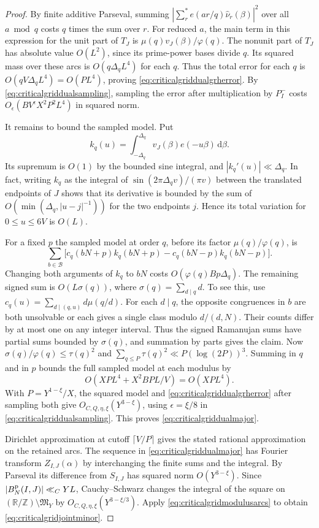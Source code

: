 \documentclass[11pt,a4paper]{article}
\numberwithin{equation}{section}
\newcommand{\ud}{\mathrm d}
\begin{document}
\begin{proof}
By finite additive Parseval, summing
$|\sum_r^*e(ar/q)\widehat\nu_r(\beta)|^2$ over all $a\bmod q$
costs $q$ times the sum over $r$. For reduced $a$, the main
term in this expression for the unit part of $T_J$ is
$\mu(q)v_J(\beta)/\varphi(q)$. The nonunit part of $T_J$
has absolute value $O(L^2)$, since its prime-power bases
divide $q$. Its squared mass over these arcs is
$O(q\Delta_q L^4)$ for each $q$. Thus the total error for
each $q$ is $O(qV\Delta_q L^4)=O(PL^4)$, proving
\cref{eq:criticalgriddualgrherror}. By
\cref{eq:criticalgriddualsampling}, sampling the error after
multiplication by $P_I^-$ costs $O_\epsilon(BV^\epsilon X^2P^2L^4)$
in squared norm.

It remains to bound the sampled model. Put
\[
 k_q(u)=\int_{-\Delta_q}^{\Delta_q}v_J(\beta)e(-u\beta)\,\ud\beta .
\]
Its supremum is $O(1)$ by the bounded sine integral, and
$|k_q'(u)|\ll \Delta_q$. In fact, writing $k_q$ as the
integral of $\sin(2\pi\Delta_q v)/(\pi v)$ between the
translated endpoints of $J$ shows that its derivative is
bounded by the sum of
$O(\min(\Delta_q,|u-j|^{-1}))$ for the two endpoints $j$.
Hence its total variation for $0\le u\le 6V$ is $O(L)$.

For a fixed $p$ the sampled model at order $q$, before its
factor $\mu(q)/\varphi(q)$, is
\[
 \sum_{b\in\mathcal B}\bigl[
     c_q(bN+p)k_q(bN+p)-c_q(bN-p)k_q(bN-p)\bigr].
\]
Changing both arguments of $k_q$ to $bN$ costs
$O(\varphi(q)Bp\Delta_q)$. The remaining signed sum is
$O(L\sigma(q))$, where $\sigma(q)=\sum_{d\mid q}d$.
To see this, use $c_q(u)=\sum_{d\mid(q,u)}d\mu(q/d)$.
For each $d\mid q$, the opposite congruences in $b$ are
both unsolvable or each gives a single class modulo $d/(d,N)$.
Their counts differ by at most one on any integer interval.
Thus the signed Ramanujan sums have partial sums bounded
by $\sigma(q)$, and summation by parts gives the claim.
Now $\sigma(q)/\varphi(q)\le\tau(q)^2$ and
$\sum_{q\le P}\tau(q)^2\ll P(\log(2P))^3$. Summing in $q$
and in $p$ bounds the full sampled model at each modulus by
\[
 O(XPL^4 + X^2BP L/V)=O(XP L^4).
\]
With $P=Y^{1-\xi}/X$, the squared model and
\cref{eq:criticalgriddualgrherror} after sampling both give
$O_{C,Q,\eta,\xi}(Y^{3-\xi})$, using $\epsilon=\xi/8$ in
\cref{eq:criticalgriddualsampling}. This proves
\cref{eq:criticalgriddualmajor}.

Dirichlet approximation at cutoff $\lceil V/P\rceil$
gives the stated rational approximation on the retained arcs.
The sequence in \cref{eq:criticalgriddualmajor} has Fourier
transform $Z_{I,J}(\alpha)$ by interchanging the finite sums
and the integral. By Parseval its difference from $S_{I,J}$
has squared norm $O(Y^{3-\xi})$. Since
$|B_N^{\rm p}(I,J)|\ll_C YL$, Cauchy--Schwarz changes the
integral of the square on $(\mathbb R/\mathbb Z)\setminus\mathfrak M_Y$
by $O_{C,Q,\eta,\xi}(Y^{3-\xi/3})$. Apply
\cref{eq:criticalgridmodulusarcs} to obtain
\cref{eq:criticalgridjointminor}.
\end{proof}
\end{document}
